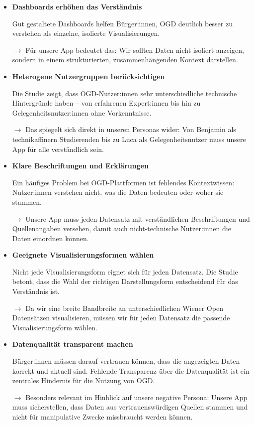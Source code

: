\begin{itemize}

    \item \textbf{Dashboards erhöhen das Verständnis}

    Gut gestaltete Dashboards helfen Bürger:innen, OGD deutlich besser zu verstehen als einzelne, isolierte Visualisierungen.

    $\rightarrow$ Für unsere App bedeutet das: Wir sollten Daten nicht isoliert anzeigen, sondern in einem strukturierten, zusammenhängenden Kontext darstellen.

    \item \textbf{Heterogene Nutzergruppen berücksichtigen}

    Die Studie zeigt, dass OGD-Nutzer:innen sehr unterschiedliche technische Hintergründe haben -- von erfahrenen Expert:innen bis hin zu Gelegenheitsnutzer:innen ohne Vorkenntnisse.

    $\rightarrow$ Das spiegelt sich direkt in unseren Personas wider: Von Benjamin als technikaffinern Studierenden bis zu Luca als Gelegenheitsnutzer muss unsere App für alle verständlich sein.

    \item \textbf{Klare Beschriftungen und Erklärungen}

    Ein häufiges Problem bei OGD-Plattformen ist fehlendes Kontextwissen: Nutzer:innen verstehen nicht, was die Daten bedeuten oder woher sie stammen.

    $\rightarrow$ Unsere App muss jeden Datensatz mit verständlichen Beschriftungen und Quellenangaben versehen, damit auch nicht-technische Nutzer:innen die Daten einordnen können.

    \item \textbf{Geeignete Visualisierungsformen wählen}

    Nicht jede Visualisierungsform eignet sich für jeden Datensatz. Die Studie betont, dass die Wahl der richtigen Darstellungsform entscheidend für das Verständnis ist.

    $\rightarrow$ Da wir eine breite Bandbreite an unterschiedlichen Wiener Open Datensätzen visualisieren, müssen wir für jeden Datensatz die passende Visualisierungsform wählen.

    \item \textbf{Datenqualität transparent machen}

    Bürger:innen müssen darauf vertrauen können, dass die angezeigten Daten korrekt und aktuell sind. Fehlende Transparenz über die Datenqualität ist ein zentrales Hindernis für die Nutzung von OGD.

    $\rightarrow$ Besonders relevant im Hinblick auf unsere negative Persona: Unsere App muss sicherstellen, dass Daten aus vertrauenswürdigen Quellen stammen und nicht für manipulative Zwecke missbraucht werden können.

\end{itemize}


